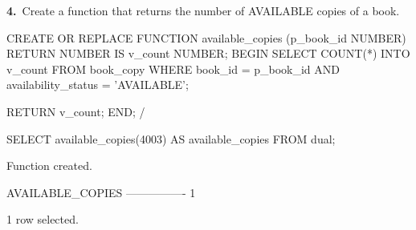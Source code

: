 \noindent\begin{minipage}{\linewidth}
\begingroup{}
{\fontsize{14}{17}\selectfont\textbf{4.}}\ Create a function that returns the number of AVAILABLE copies of a book.\par
\endgroup\vspace{12pt}


\begin{sqlcode}
CREATE OR REPLACE FUNCTION available_copies (p_book_id NUMBER)
RETURN NUMBER
IS
   v_count NUMBER;
BEGIN
   SELECT COUNT(*) INTO v_count
   FROM book_copy
   WHERE book_id = p_book_id
     AND availability_status = 'AVAILABLE';

   RETURN v_count;
END;
/

SELECT available_copies(4003) AS available_copies FROM dual;
\end{sqlcode}

\vspace{18pt}


\begin{sqlout}[fontsize=\small]
Function created.

AVAILABLE_COPIES
----------------
               1

1 row selected.
\end{sqlout}
\end{minipage}\par\vspace{24pt}

